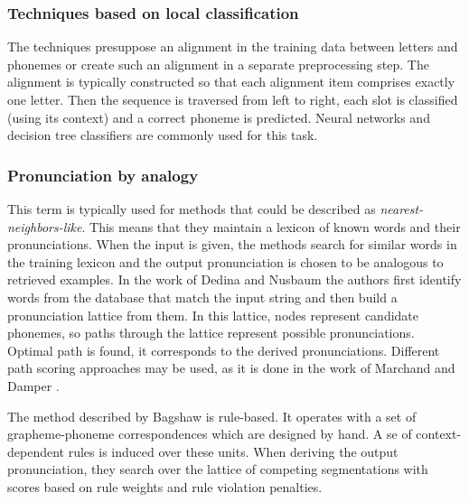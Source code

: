 \subsubsection{Techniques based on local classification}
The techniques presuppose an alignment in the training data between letters and phonemes or create such an alignment in a separate preprocessing step.
The alignment is typically constructed so that each alignment item comprises exactly one letter.
Then the sequence is traversed from left to right, each slot is classified (using its context) and a correct phoneme is predicted.
Neural networks and decision tree classifiers are commonly used for this task.
\subsubsection{Pronunciation by analogy}
This term is typically used for methods that could be described as \textit{nearest-neighbors-like}.
This means that they maintain a lexicon of known words and their pronunciations.
When the input is given, the methods search for similar words in the training lexicon and the output pronunciation is chosen to be analogous to retrieved examples. 
In the work of Dedina and Nusbaum \cite{dedina1991pronounce} the authors first identify words from the database that match the input string and then build a pronunciation lattice from them.
In this lattice, nodes represent candidate phonemes, so paths through the lattice represent possible pronunciations.
Optimal path is found, it corresponds to the derived pronunciations.
Different path scoring approaches may be used, as it is done in the work of Marchand and Damper \citep{marchand2000multistrategy}.
\par
The method described by Bagshaw \cite{bagshaw1998phonemic} is rule-based.
It operates with a set of grapheme-phoneme correspondences which are designed by hand.
A se of context-dependent rules is induced over these units.
When deriving the output pronunciation, they search over the lattice of competing segmentations with scores based on rule weights and rule violation penalties.
\par
